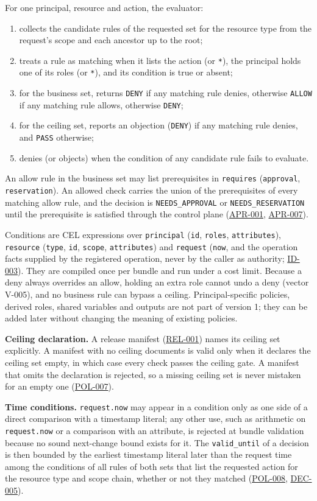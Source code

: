 \documentclass[11pt,a4paper]{article}
\newcommand{\code}[1]{{\small\nolinkurl{#1}}}
\newcommand{\rr}[1]{\hyperlink{req:#1}{#1}}
\begin{document}
For one principal, resource and action, the evaluator:
\begin{enumerate}
\item collects the candidate rules of the requested set for the resource type from the request's scope and each ancestor up to the root;
\item treats a rule as matching when it lists the action (or \code{*}), the principal holds one of its roles (or \code{*}), and its condition is true or absent;
\item for the business set, returns \code{DENY} if any matching rule denies, otherwise \code{ALLOW} if any matching rule allows, otherwise \code{DENY};
\item for the ceiling set, reports an objection (\code{DENY}) if any matching rule denies, and \code{PASS} otherwise;
\item denies (or objects) when the condition of any candidate rule fails to evaluate.
\end{enumerate}
An allow rule in the business set may list prerequisites in \code{requires} (\code{approval}, \code{reservation}). An allowed check carries the union of the prerequisites of every matching allow rule, and the decision is \code{NEEDS_APPROVAL} or \code{NEEDS_RESERVATION} until the prerequisite is satisfied through the control plane (\rr{APR-001}, \rr{APR-007}).

Conditions are CEL expressions over \code{principal} (\code{id}, \code{roles}, \code{attributes}), \code{resource} (\code{type}, \code{id}, \code{scope}, \code{attributes}) and \code{request} (\code{now}, and the operation facts supplied by the registered operation, never by the caller as authority; \rr{ID-003}). They are compiled once per bundle and run under a cost limit. Because a deny always overrides an allow, holding an extra role cannot undo a deny (vector V-005), and no business rule can bypass a ceiling. Principal-specific policies, derived roles, shared variables and outputs are not part of version 1; they can be added later without changing the meaning of existing policies.

\textbf{Ceiling declaration.} A release manifest (\rr{REL-001}) names its ceiling set explicitly. A manifest with no ceiling documents is valid only when it declares the ceiling set empty, in which case every check passes the ceiling gate. A manifest that omits the declaration is rejected, so a missing ceiling set is never mistaken for an empty one (\rr{POL-007}).

\textbf{Time conditions.} \code{request.now} may appear in a condition only as one side of a direct comparison with a timestamp literal; any other use, such as arithmetic on \code{request.now} or a comparison with an attribute, is rejected at bundle validation because no sound next-change bound exists for it. The \code{valid_until} of a decision is then bounded by the earliest timestamp literal later than the request time among the conditions of all rules of both sets that list the requested action for the resource type and scope chain, whether or not they matched (\rr{POL-008}, \rr{DEC-005}).
\end{document}
